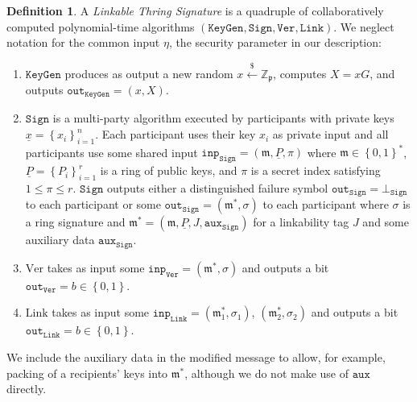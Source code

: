 \documentclass{iacrtrans}
\theoremstyle{definition}
\numberwithin{theorem}{subsection}
\numberwithin{lemma}{theorem}
\newtheorem{defn}[theorem]{Definition}
\newcommand{\scalarField}{\mathbb{Z}_{\mathfrak{p}}}
\newcommand{\m}{\mathfrak{m}}
\begin{document}
\begin{defn}
A \textit{Linkable Thring Signature} is a quadruple of collaboratively computed polynomial-time algorithms $(\texttt{KeyGen}, \texttt{Sign}, \texttt{Ver}, \texttt{Link})$. We neglect notation for the common input $\eta$, the security parameter in our description:

\begin{enumerate}

\item $\texttt{KeyGen}$ produces as output a new random $x \overset{\$}{\leftarrow} \scalarField$, computes $X = xG$, and outputs $\texttt{out}_{\texttt{KeyGen}} = (x,X)$.

\item $\texttt{Sign}$ is a multi-party algorithm executed by participants with private keys $\underline{x} = \left\{x_i\right\}_{i=1}^{n}$. Each participant uses their key $x_i$ as private input and all participants use some shared input $\texttt{inp}_{\texttt{Sign}} = (\m, \underline{P}, \pi)$ where $\m \in \left\{0,1\right\}^*$, $\underline{P} = \left\{P_i\right\}_{i=1}^{r}$ is a ring of public keys, and $\pi$ is a secret index satisfying $1 \leq \pi \leq r$. $\texttt{Sign}$ outputs either a distinguished failure symbol $\texttt{out}_{\texttt{Sign}} = \bot_{\texttt{Sign}}$ to each participant or some $\texttt{out}_{\texttt{Sign}} = (\m^*, \sigma)$ to each participant where  $\sigma$ is a ring signature and $\m^* = (\m, \underline{P}, J, \texttt{aux}_{\texttt{Sign}})$ for a linkability tag $J$ and some auxiliary data $\texttt{aux}_{\texttt{Sign}}$.



\item $\text{Ver}$ takes as input some $\texttt{inp}_{\texttt{Ver}} = (\m^*, \sigma)$ and outputs a bit $\texttt{out}_{\texttt{Ver}} = b \in \left\{0,1\right\}$. %

\item $\text{Link}$ takes as input some $\texttt{inp}_{\texttt{Link}} = (\m_1^*, \sigma_1)$, $(\m_2^*, \sigma_2)$ and outputs a bit $\texttt{out}_{\texttt{Link}} = b \in \left\{0,1\right\}$.

\end{enumerate} 
\end{defn} We include the auxiliary data in the modified message to allow, for example, packing of a recipients' keys into $\m^*$, although we do not make use of $\texttt{aux}$ directly.
\end{document}
